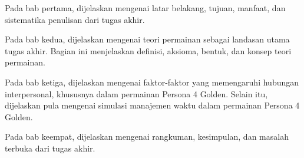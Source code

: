 Pada bab pertama, dijelaskan mengenai latar belakang, tujuan, manfaat, dan sistematika penulisan dari tugas akhir.

Pada bab kedua, dijelaskan mengenai teori permainan sebagai landasan utama tugas akhir. Bagian ini menjelaskan definisi, aksioma, bentuk, dan konsep teori permainan.

Pada bab ketiga, dijelaskan mengenai faktor-faktor yang memengaruhi hubungan interpersonal, khususnya dalam permainan Persona 4 Golden. Selain itu, dijelaskan pula mengenai simulasi manajemen waktu dalam permainan Persona 4 Golden.

Pada bab keempat, dijelaskan mengenai rangkuman, kesimpulan, dan masalah terbuka dari tugas akhir.



